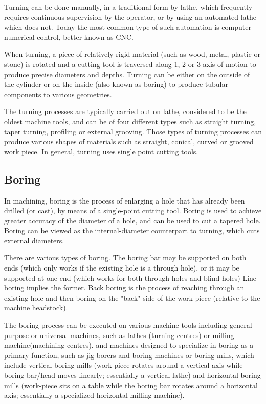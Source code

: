 Turning can be done manually, in a traditional form by lathe, which frequently requires continuous supervision by the operator, or by using an automated lathe which does not. Today the most common type of such automation is computer numerical control, better known as CNC.

When turning, a piece of relatively rigid material (such as wood, metal, plastic or stone) is rotated and a cutting tool is traversed along 1, 2 or 3 axis of motion to produce precise diameters and depths. Turning can be either on the outside of the cylinder or on the inside (also known as boring) to produce tubular components to various geometries.

The turning processes are typically carried out on lathe, considered to be the oldest machine tools, and can be of four different types such as straight turning, taper turning, profiling or external grooving. Those types of turning processes can produce various shapes of materials such as straight, conical, curved or grooved work piece. In general, turning uses single point cutting tools.

\subsection{Boring} \label{Boring}
In machining, boring is the process of enlarging a hole that has already been drilled (or cast), by means of a single-point cutting tool. Boring is used to achieve greater accuracy of the diameter of a hole, and can be used to cut a tapered hole. Boring can be viewed as the internal-diameter counterpart to turning, which cuts external diameters.

There are various types of boring. The boring bar may be supported on both ends (which only works if the existing hole is a through hole), or it may be supported at one end (which works for both through holes and blind holes) Line boring implies the former. Back boring is the process of reaching through an existing hole and then boring on the "back" side of the work-piece (relative to the machine headstock).

The boring process can be executed on various machine tools including general purpose or universal machines, such as lathes (turning centres) or milling machine(machining centres). and machines designed to specialize in boring as a primary function, such as jig borers and boring machines or boring mills, which include vertical boring mills (work-piece rotates around a vertical axis while boring bar/head moves linearly; essentially a vertical lathe) and horizontal boring mills (work-piece sits on a table while the boring bar rotates around a horizontal axis; essentially a specialized horizontal milling machine).

